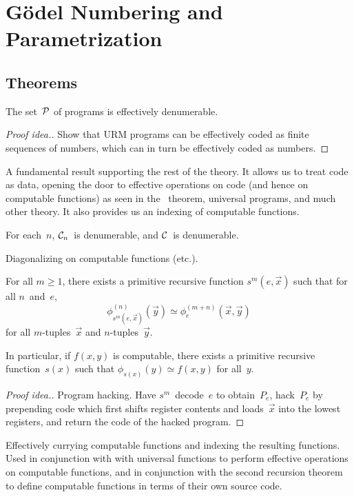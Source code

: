 %
%
%
\section{G\"odel Numbering and Parametrization}
\subsection*{Theorems}
\begin{thm}
The set~\(\P\) of programs is effectively denumerable.
\end{thm}
\begin{proof}[Proof idea.]
Show that URM programs can be effectively coded as finite sequences of numbers, which can in turn be effectively coded as numbers.
\end{proof}
\begin{app}
A fundamental result supporting the rest of the theory. It allows us to treat code as data, opening the door to effective operations on code (and hence on computable functions) as seen in the \smn\ theorem, universal programs, and much other theory. It also provides us an indexing of computable functions.
\end{app}

\begin{cor}
For each~\(n\), \(\CC_n\)~is denumerable, and \(\CC\)~is denumerable.
\end{cor}
\begin{app}
Diagonalizing on computable functions (etc.).
\end{app}

\begin{thm}
For all \(m\ge1\), there exists a primitive recursive function \(s^m(e,\vec{x})\) such that for all \(n\)~and~\(e\),
\[\phi_{s^m(e,\vec{x})}^{(n)}(\vec{y})\simeq\phi_e^{(m+n)}(\vec{x},\vec{y})\]
for all \(m\)-tuples~\(\vec{x}\) and \(n\)-tuples~\(\vec{y}\).

In particular, if \(f(x,y)\) is computable, there exists a primitive recursive function~\(s(x)\) such that \(\phi_{s(x)}(y)\simeq f(x,y)\) for all~\(y\).
\end{thm}
\begin{proof}[Proof idea.]
Program hacking. Have \(s^m\)~decode~\(e\) to obtain~\(P_e\), hack~\(P_e\) by prepending code which first shifts register contents and loads~\(\vec{x}\) into the lowest registers, and return the code of the hacked program.
\end{proof}
\begin{app}
Effectively currying computable functions and indexing the resulting functions. Used in conjunction with with universal functions to perform effective operations on computable functions, and in conjunction with the second recursion theorem to define computable functions in terms of their own source code.
\end{app}
